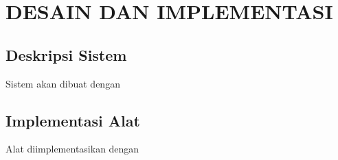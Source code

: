 \chapter{DESAIN DAN IMPLEMENTASI}
\vspace{4ex}

\setlength{\parindent}{7ex}

\section{Deskripsi Sistem}
\vspace{1ex}

Sistem akan dibuat dengan \lipsum[1]
\vspace{0.5ex}

\lipsum[2]
\vspace{0.5ex}

\newpage

\section{Implementasi Alat}
\vspace{1ex}

Alat diimplementasikan dengan \lipsum[3]
\vspace{0.5ex}

\lipsum[4]
\vspace{0.5ex}